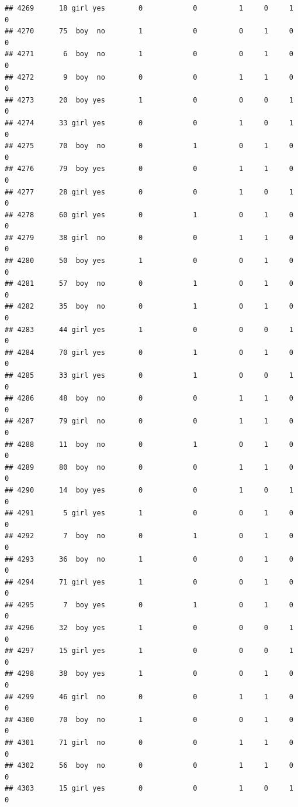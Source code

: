 \documentclass[man]{apa6}
\begin{document}
\begin{verbatim}
## 4269      18 girl yes        0            0          1     0     1     0
## 4270      75  boy  no        1            0          0     1     0     0
## 4271       6  boy  no        1            0          0     1     0     0
## 4272       9  boy  no        0            0          1     1     0     0
## 4273      20  boy yes        1            0          0     0     1     0
## 4274      33 girl yes        0            0          1     0     1     0
## 4275      70  boy  no        0            1          0     1     0     0
## 4276      79  boy yes        0            0          1     1     0     0
## 4277      28 girl yes        0            0          1     0     1     0
## 4278      60 girl yes        0            1          0     1     0     0
## 4279      38 girl  no        0            0          1     1     0     0
## 4280      50  boy yes        1            0          0     1     0     0
## 4281      57  boy  no        0            1          0     1     0     0
## 4282      35  boy  no        0            1          0     1     0     0
## 4283      44 girl yes        1            0          0     0     1     0
## 4284      70 girl yes        0            1          0     1     0     0
## 4285      33 girl yes        0            1          0     0     1     0
## 4286      48  boy  no        0            0          1     1     0     0
## 4287      79 girl  no        0            0          1     1     0     0
## 4288      11  boy  no        0            1          0     1     0     0
## 4289      80  boy  no        0            0          1     1     0     0
## 4290      14  boy yes        0            0          1     0     1     0
## 4291       5 girl yes        1            0          0     1     0     0
## 4292       7  boy  no        0            1          0     1     0     0
## 4293      36  boy  no        1            0          0     1     0     0
## 4294      71 girl yes        1            0          0     1     0     0
## 4295       7  boy yes        0            1          0     1     0     0
## 4296      32  boy yes        1            0          0     0     1     0
## 4297      15 girl yes        1            0          0     0     1     0
## 4298      38  boy yes        1            0          0     1     0     0
## 4299      46 girl  no        0            0          1     1     0     0
## 4300      70  boy  no        1            0          0     1     0     0
## 4301      71 girl  no        0            0          1     1     0     0
## 4302      56  boy  no        0            0          1     1     0     0
## 4303      15 girl yes        0            0          1     0     1     0

\end{verbatim}
\end{document}
